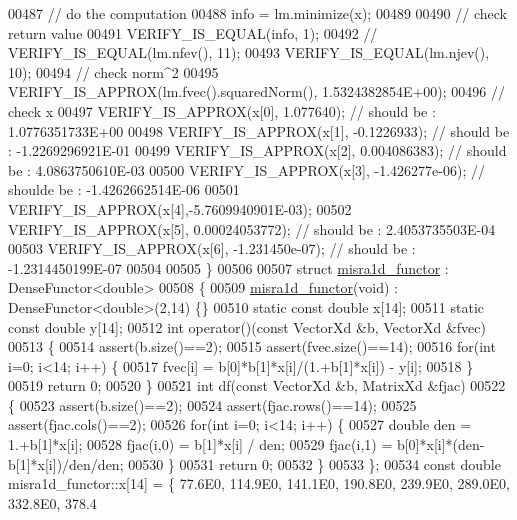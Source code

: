 \begin{DoxyCode}
00487   \textcolor{comment}{// do the computation}
00488   info = lm.minimize(x);
00489 
00490   \textcolor{comment}{// check return value}
00491   VERIFY\_IS\_EQUAL(info, 1);
00492 \textcolor{comment}{//   VERIFY\_IS\_EQUAL(lm.nfev(), 11);}
00493   VERIFY\_IS\_EQUAL(lm.njev(), 10);
00494   \textcolor{comment}{// check norm^2}
00495   VERIFY\_IS\_APPROX(lm.fvec().squaredNorm(), 1.5324382854E+00);
00496   \textcolor{comment}{// check x}
00497   VERIFY\_IS\_APPROX(x[0], 1.077640); \textcolor{comment}{// should be :  1.0776351733E+00}
00498   VERIFY\_IS\_APPROX(x[1], -0.1226933); \textcolor{comment}{// should be : -1.2269296921E-01}
00499   VERIFY\_IS\_APPROX(x[2], 0.004086383); \textcolor{comment}{// should be : 4.0863750610E-03}
00500   VERIFY\_IS\_APPROX(x[3], -1.426277e-06); \textcolor{comment}{// shoulde be : -1.4262662514E-06}
00501   VERIFY\_IS\_APPROX(x[4],-5.7609940901E-03);
00502   VERIFY\_IS\_APPROX(x[5], 0.00024053772); \textcolor{comment}{// should be : 2.4053735503E-04}
00503   VERIFY\_IS\_APPROX(x[6], -1.231450e-07); \textcolor{comment}{// should be : -1.2314450199E-07}
00504 
00505 \}
00506 
00507 \textcolor{keyword}{struct }\hyperlink{structmisra1d__functor}{misra1d\_functor} : DenseFunctor<double>
00508 \{
00509     \hyperlink{structmisra1d__functor}{misra1d\_functor}(\textcolor{keywordtype}{void}) : DenseFunctor<double>(2,14) \{\}
00510     \textcolor{keyword}{static} \textcolor{keyword}{const} \textcolor{keywordtype}{double} x[14];
00511     \textcolor{keyword}{static} \textcolor{keyword}{const} \textcolor{keywordtype}{double} y[14];
00512     \textcolor{keywordtype}{int} operator()(\textcolor{keyword}{const} VectorXd &b, VectorXd &fvec)
00513     \{
00514         assert(b.size()==2);
00515         assert(fvec.size()==14);
00516         \textcolor{keywordflow}{for}(\textcolor{keywordtype}{int} i=0; i<14; i++) \{
00517             fvec[i] = b[0]*b[1]*x[i]/(1.+b[1]*x[i]) - y[i];
00518         \}
00519         \textcolor{keywordflow}{return} 0;
00520     \}
00521     \textcolor{keywordtype}{int} df(\textcolor{keyword}{const} VectorXd &b, MatrixXd &fjac)
00522     \{
00523         assert(b.size()==2);
00524         assert(fjac.rows()==14);
00525         assert(fjac.cols()==2);
00526         \textcolor{keywordflow}{for}(\textcolor{keywordtype}{int} i=0; i<14; i++) \{
00527             \textcolor{keywordtype}{double} den = 1.+b[1]*x[i];
00528             fjac(i,0) = b[1]*x[i] / den;
00529             fjac(i,1) = b[0]*x[i]*(den-b[1]*x[i])/den/den;
00530         \}
00531         \textcolor{keywordflow}{return} 0;
00532     \}
00533 \};
00534 \textcolor{keyword}{const} \textcolor{keywordtype}{double} misra1d\_functor::x[14] = \{ 77.6E0, 114.9E0, 141.1E0, 190.8E0, 239.9E0, 289.0E0, 332.8E0, 378.4

\end{DoxyCode}
